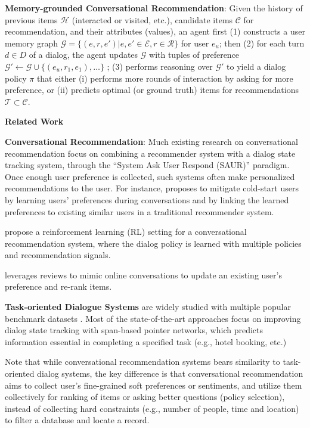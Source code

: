 \noindent\textbf{Memory-grounded Conversational Recommendation}:
Given the history of previous items $\mathcal{H}$ (interacted or visited, etc.), candidate items $\mathcal{C}$ for recommendation, and their attributes (values), 
an agent first (1) constructs a user memory graph $\mathcal{G} = \{(e, r, e')\vert e, e' \in \mathcal{E}, r \in \mathcal{R} \}$ for user $e_u$; 
then (2) for each turn $d \in D$ of a dialog, the agent updates $\mathcal{G}$ with tuples of preference $\mathcal{G}' \gets \mathcal{G} \cup \{(e_u, r_1, e_1), \dots\}$ ;
(3) performs reasoning over $\mathcal{G}'$ to yield a dialog policy $\pi$ that
either (i) performs more rounds of interaction by asking for more preference, 
or (ii) predicts optimal (or ground truth) items for recommendations $\mathcal{T} \subset \mathcal{C}$.

\textbf{Related Work}

\noindent \textbf{Conversational Recommendation}:
Much existing research on conversational recommendation focus on combining a recommender system with a dialog state tracking system, through the ``System Ask User Respond (SAUR)'' paradigm.
Once enough user preference is collected, such systems often make personalized recommendations to the user.
For instance, \cite{li2018towards} proposes to mitigate cold-start users by learning users' preferences during conversations and by linking the learned preferences to existing similar users in a traditional recommender system.

\cite{sun2018conversational,kang2019recommendation} propose a reinforcement learning (RL) setting for a conversational recommendation system, where the dialog policy is learned with multiple policies and recommendation signals.

\cite{zhang2018towards} leverages reviews to mimic online conversations to update an existing user's preference and re-rank items.

\noindent \textbf{Task-oriented Dialogue Systems} are widely studied with multiple popular benchmark datasets \cite{dstc2, woz, multiwoz, multiwoz2.1,sgd-dst}.
Most of the state-of-the-art approaches \cite{trade,bert-dst-alexa,bert-dst-cmu} focus on improving dialog state tracking with span-based pointer networks, which predicts information essential in completing a specified task (e.g., hotel booking, etc.)

Note that while conversational recommendation systems bears similarity to task-oriented dialog systems, the key difference is that conversational recommendation aims to collect user's fine-grained soft preferences or sentiments, and utilize them collectively for ranking of items or asking better questions (policy selection), instead of collecting hard constraints (e.g., number of people, time and location) to filter a database and locate a record. 

